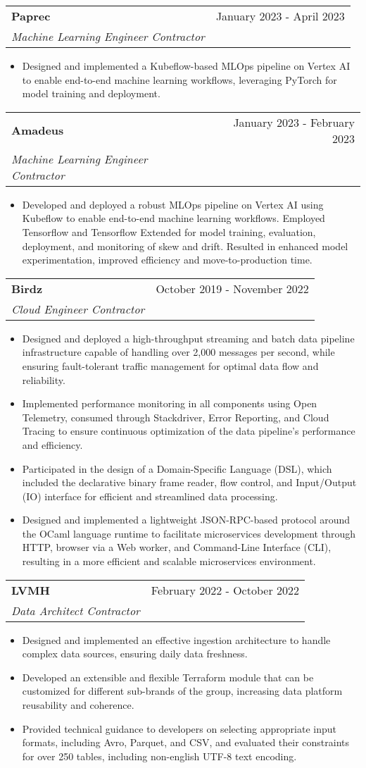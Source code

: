 \documentclass[letterpaper,11pt]{article}
\makeatletter
\newcommand{\resumeItem}[1]{
  \item\small{#1 \vspace{-2pt}}
}
\newcommand{\resumeSubheading}[3]{
  \vspace{-1pt}\item
    \begin{tabular*}{0.97\textwidth}[t]{l@{\extracolsep{\fill}}r}
      \textbf{#1} & #2 \\
      \textit{\small #3} \\
    \end{tabular*}\vspace{-5pt}
}
\newcommand{\resumeItemListStart}{\begin{itemize}}
\newcommand{\resumeItemListEnd}{\end{itemize}\vspace{-5pt}}
\makeatother
\begin{document}
\resumeSubheading{Paprec}
{January 2023 - April 2023}
{Machine Learning Engineer Contractor}
\resumeItemListStart{}
\resumeItem{
	Designed and implemented a Kubeflow-based MLOps pipeline on Vertex AI to enable
	end-to-end machine learning workflows, leveraging PyTorch for model training and
	deployment.
}
\resumeItemListEnd{}


\resumeSubheading{Amadeus}
{January 2023 - February 2023}
{Machine Learning Engineer Contractor}
\resumeItemListStart{}
\resumeItem{
	Developed and deployed a robust MLOps pipeline on Vertex AI using Kubeflow to
	enable end-to-end machine learning workflows. Employed Tensorflow and Tensorflow
	Extended for model training, evaluation, deployment, and monitoring of skew and
	drift. Resulted in enhanced model experimentation, improved efficiency and
	move-to-production time.
}
\resumeItemListEnd{}


\resumeSubheading{Birdz}
{October 2019 - November 2022}
{Cloud Engineer Contractor}
\resumeItemListStart{}
\resumeItem{
	Designed and deployed a high-throughput streaming and batch data pipeline
	infrastructure capable of handling over 2,000 messages per second, while ensuring
	fault-tolerant traffic management for optimal data flow and reliability.
}
\resumeItem{
	Implemented performance monitoring in all components using Open Telemetry,
	consumed through Stackdriver, Error Reporting, and Cloud Tracing to ensure
	continuous optimization of the data pipeline's performance and efficiency.
}
\resumeItem{
	Participated in the design of a Domain-Specific Language (DSL), which included the
	declarative binary frame reader, flow control, and Input/Output (IO) interface
	for efficient and streamlined data processing.
}
\resumeItem{
	Designed and implemented a lightweight JSON-RPC-based protocol around the
	OCaml language runtime to facilitate microservices development through HTTP,
	browser via a Web worker, and Command-Line Interface (CLI), resulting in a more
	efficient and scalable microservices environment.
}
\resumeItemListEnd{}


\resumeSubheading{LVMH}
{February 2022 - October 2022}
{Data Architect Contractor}
\resumeItemListStart{}
\resumeItem{
	Designed and implemented an effective ingestion architecture to handle complex
	data sources, ensuring daily data freshness.
}
\resumeItem{
	Developed an extensible and flexible Terraform module that can be customized for
	different sub-brands of the group, increasing data platform reusability and
	coherence.
}
\resumeItem{
	Provided technical guidance to developers on selecting appropriate input formats,
	including Avro, Parquet, and CSV, and evaluated their constraints for over 250
	tables, including non-english UTF-8 text encoding.
}
\resumeItemListEnd{}
\end{document}
